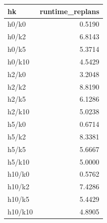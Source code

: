 \begin{tabular}{lr}
\toprule
hk & runtime_replans \\
\midrule
h0/k0 & 0.5190 \\
h0/k2 & 6.8143 \\
h0/k5 & 5.3714 \\
h0/k10 & 4.5429 \\
h2/k0 & 3.2048 \\
h2/k2 & 8.8190 \\
h2/k5 & 6.1286 \\
h2/k10 & 5.0238 \\
h5/k0 & 0.6714 \\
h5/k2 & 8.3381 \\
h5/k5 & 5.6667 \\
h5/k10 & 5.0000 \\
h10/k0 & 0.5762 \\
h10/k2 & 7.4286 \\
h10/k5 & 5.4429 \\
h10/k10 & 4.8905 \\
\bottomrule
\end{tabular}
